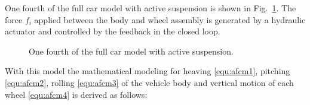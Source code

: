 



One fourth of the full car model with active suspension is shown in Fig.~\ref{fig:fcm_as}.
%
The force $f_i$ applied between the body and wheel assembly is generated by a hydraulic actuator and controlled by the feedback in the closed loop.
 
 \begin{figure}%
 \footnotesize
 \centering
 
 \caption{One fourth of the full car model with active suspension.}
 \label{fig:fcm_as}%
 \end{figure}
 
 With this model the mathematical modeling for heaving \eqref{equ:afcm1}, pitching \eqref{equ:afcm2}, rolling \eqref{equ:afcm3} of the vehicle body and vertical motion of each wheel \eqref{equ:afcm4} is derived as follows:
 
